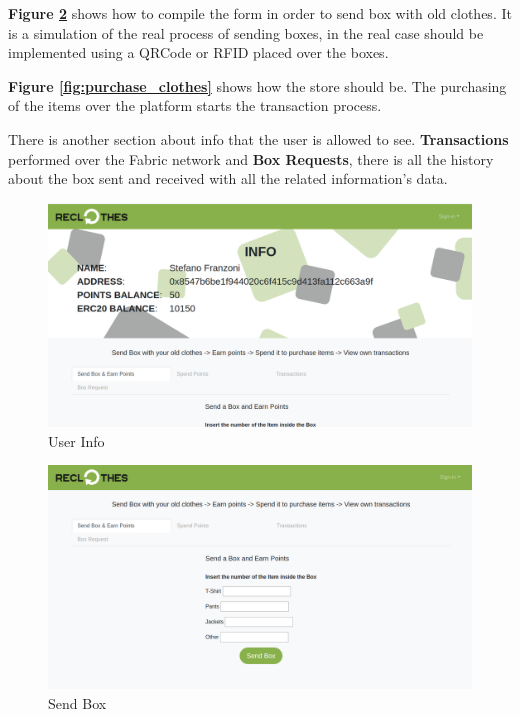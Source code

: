 \textbf{Figure \ref{fig:send_box}} shows how to compile the form in order to send box with old clothes. 
It is a simulation of the real process of sending boxes, in the real case should be implemented using a QRCode 
or RFID placed over the boxes.

\textbf{Figure \ref{fig:purchase_clothes}} shows how the store should be. The purchasing of the items over 
the platform starts the transaction process. 

There is another section about info that the user is allowed to see. \textbf{Transactions} performed over the 
Fabric network and \textbf{Box Requests}, there is all the history about the box sent and received with all 
the related information's data. 

\begin{figure}[h!]
    \centering
    \includegraphics[totalheight=7.5cm]{img/dapp/user-info.png}
    \caption{User Info}
    \label{fig:user_info}
\end{figure}

\begin{figure}[h!]
    \centering
    \includegraphics[totalheight=7.5cm]{img/dapp/user-send.png}
    \caption{Send Box}
    \label{fig:send_box}
\end{figure}

